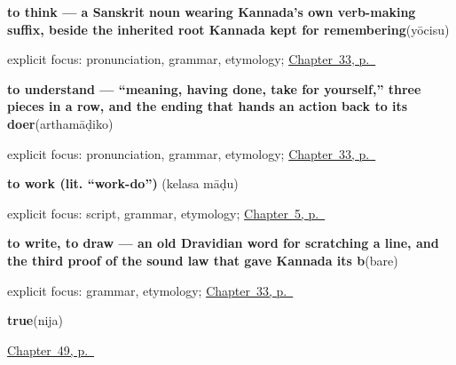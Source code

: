 \noindent\begin{minipage}[t]{\linewidth}
\raggedright
\textbf{to think — a Sanskrit noun wearing Kannada's own verb-making suffix, beside the inherited root Kannada kept for remembering}\enspace\emph{}\enspace(yōcisu)\par
\footnotesize explicit focus: pronunciation, grammar, etymology; \hyperref[ch:ka-mind-verbs]{Chapter~33, p.~\pageref*{ch:ka-mind-verbs}}
\end{minipage}\par\smallskip

\noindent\begin{minipage}[t]{\linewidth}
\raggedright
\textbf{to understand — \textquotedblleft{}meaning, having done, take for yourself,\textquotedblright{} three pieces in a row, and the ending that hands an action back to its doer}\enspace\emph{}\enspace(arthamāḍiko)\par
\footnotesize explicit focus: pronunciation, grammar, etymology; \hyperref[ch:ka-mind-verbs]{Chapter~33, p.~\pageref*{ch:ka-mind-verbs}}
\end{minipage}\par\smallskip

\noindent\begin{minipage}[t]{\linewidth}
\raggedright
\textbf{to work (lit. \textquotedblleft{}work-do\textquotedblright{})}\enspace\emph{ }\enspace(kelasa māḍu)\par
\footnotesize explicit focus: script, grammar, etymology; \hyperref[ch:first-verbs]{Chapter~5, p.~\pageref*{ch:first-verbs}}
\end{minipage}\par\smallskip

\noindent\begin{minipage}[t]{\linewidth}
\raggedright
\textbf{to write, to draw — an old Dravidian word for scratching a line, and the third proof of the sound law that gave Kannada its b}\enspace\emph{}\enspace(bare)\par
\footnotesize explicit focus: grammar, etymology; \hyperref[ch:ka-mind-verbs]{Chapter~33, p.~\pageref*{ch:ka-mind-verbs}}
\end{minipage}\par\smallskip

\noindent\begin{minipage}[t]{\linewidth}
\raggedright
\textbf{true}\enspace\emph{}\enspace(nija)\par
\footnotesize \hyperref[ch:ka-replies]{Chapter~49, p.~\pageref*{ch:ka-replies}}
\end{minipage}\par\smallskip


